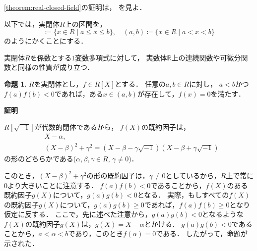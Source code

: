 \documentclass[uplatex, dvipdfmx]{jsarticle}
\makeatletter
\numberwithin{equation}{section}
\renewenvironment{proof}[1][\proofname]{\par
  \pushQED{\qed}%
  \normalfont \topsep6\p@\@plus6\p@\relax
  \trivlist
  \item\relax
  {\bfseries
  #1\@addpunct{.}}\hspace\labelsep\ignorespaces
}{
  \popQED\endtrivlist\@endpefalse
}
\newcommand{\R}{\mathbb{R}}
\theoremstyle{definition}
\newtheorem{proposition}[definition]{命題}
\renewcommand{\proofname}{\textbf{証明}}
\makeatother
\begin{document}
\cref{theorem:real-closed-field}の証明は，
\cite[Theorem 1.2.2.]{MR1659509}を見よ．

以下では，実閉体$R$上の区間を，
\begin{equation}
     [a,b]\coloneqq\{x \in R \mid a \leq x \leq b\}, \quad (a,b)\coloneqq\{x \in R \mid a < x < b\}
\end{equation}
のようにかくことにする．

実閉体$R$を係数とする$1$変数多項式に対して，
実数体$\R$上の連続関数や可微分関数と同様の性質が成り立つ．

\begin{proposition}\label{proposition:intermediate}
     $R$を実閉体とし，$f \in R[X]$とする．
     任意の$a,b \in R$に対し，
     $a < b$かつ
     $f(a)f(b)<0$であれば，ある$x \in (a,b)$が存在して，$f(x)=0$を満たす．
\end{proposition}
\begin{proof}
     $R[\sqrt{-1}]$が代数的閉体であるから，
     $f(X)$の既約因子は，
     \begin{align}
          &X-\alpha, \\
          &(X-\beta)^2 + \gamma^2 = (X-\beta-\gamma\sqrt{-1})(X-\beta+\gamma\sqrt{-1})
     \end{align}
     の形のどちらかである($\alpha, \beta, \gamma \in R$, $\gamma \neq 0$)．

     このとき，$(X-\beta)^2 + \gamma^2$の形の既約因子は，$\gamma \neq 0$としているから，$R$上で常に$0$より大きいことに注意する．
     $f(a)f(b)<0$であることから，$f(X)$のある既約因子$g(X)$について，$g(a)g(b)<0$となる．
     実際，もしすべての$f(X)$の既約因子$g(X)$について，$g(a)g(b) \geq 0$であれば，$f(a)f(b)\geq0$となり仮定に反する．
     ここで，先に述べた注意から，$g(a)g(b)<0$となるような$f(X)$の既約因子$g(X)$は，$g(X) = X - \alpha$とかける．
     $g(a)g(b) < 0$であることから，$a<\alpha<b$であり，このとき$f(\alpha)=0$である．
     したがって，命題が示された．
\end{proof}
\end{document}
